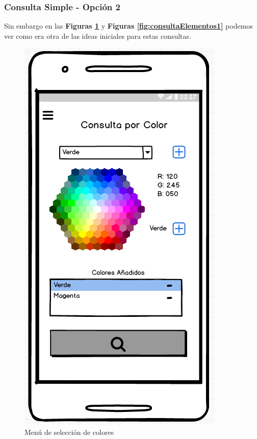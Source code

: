 \subsubsection*{Consulta Simple - Opción 2}

Sin embargo en las \textbf{Figuras \ref{fig:consultaColores1}} y \textbf{Figuras \ref{fig:consultaElementos1}} podemos ver como era otra de las ideas iniciales para estas consultas.

\newpage
\begin{multicols}{2}
    \begin{figure}[H]
    \centering
    \includegraphics[scale=0.6]{imagenes/diseno/porColor.png}
    \caption{Menú de selección de colores}
    \label{fig:consultaColores1}
    \end{figure}
    

\end{multicols}
